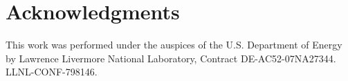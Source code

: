 \section*{Acknowledgments}

This work was performed under the auspices of the U.S. Department of
Energy by Lawrence Livermore National Laboratory, Contract
DE-AC52-07NA27344.  LLNL-CONF-798146.
